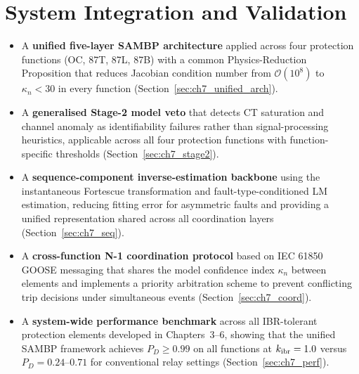 \chapter{System Integration and Validation}
\label{ch:system_integration}
\label{ch:digital_twin}%

\begin{itemize}
  \item[\textbf{C16}] A \textbf{unified five-layer SAMBP architecture} applied
        across four protection functions (OC, 87T, 87L, 87B) with a common
        Physics-Reduction Proposition that reduces Jacobian condition number
        from $\mathcal{O}(10^8)$ to $\kappa_n < 30$ in every function
        (Section~\ref{sec:ch7_unified_arch}).
  \item[\textbf{C17}] A \textbf{generalised Stage-2 model veto} that detects
        CT saturation and channel anomaly as identifiability failures rather
        than signal-processing heuristics, applicable across all four
        protection functions with function-specific thresholds
        (Section~\ref{sec:ch7_stage2}).
  \item[\textbf{C18}] A \textbf{sequence-component inverse-estimation backbone}
        using the instantaneous Fortescue transformation and fault-type-conditioned
        LM estimation, reducing fitting error for asymmetric faults and providing
        a unified representation shared across all coordination layers
        (Section~\ref{sec:ch7_seq}).
  \item[\textbf{C19}] A \textbf{cross-function N-1 coordination protocol} based
        on IEC 61850 GOOSE messaging that shares the model confidence index
        $\kappa_n$ between elements and implements a priority arbitration
        scheme to prevent conflicting trip decisions under simultaneous events
        (Section~\ref{sec:ch7_coord}).
  \item[\textbf{C20}] A \textbf{system-wide performance benchmark} across all
        IBR-tolerant protection elements developed in Chapters~3--6, showing
        that the unified SAMBP framework achieves $P_D \geq 0.99$ on all
        functions at $k_{\rm ibr} = 1.0$ versus $P_D = 0.24$--$0.71$ for
        conventional relay settings (Section~\ref{sec:ch7_perf}).
\end{itemize}

